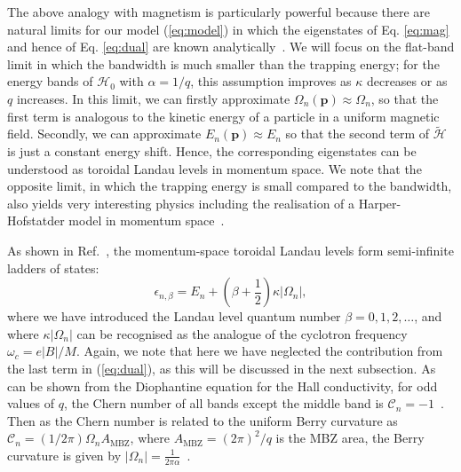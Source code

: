 \documentclass[twocolumn, 10pt, aps, superscriptaddress, floatfix, showpacs, pra, citeautoscript]{revtex4-1}
\newcommand{\vt}[1]{\mathbf{#1}}
\begin{document}
The above analogy with magnetism is particularly powerful because there are natural limits for our model (\ref{eq:model}) in which the eigenstates of Eq. \ref{eq:mag} and hence of Eq. \ref{eq:dual} are known analytically~\cite{price2014magnetic, ozawa2014momhh, Claassen_prl_2015}. We will focus on the flat-band limit in which the bandwidth is much smaller than the trapping energy; for the energy bands of $\mathcal{H}_0$ with $\alpha = 1/q$, this assumption improves as $\kappa$ decreases or as $q$ increases. In this limit, we can firstly approximate $\Omega_{n}(\mathbf{p}) \approx \Omega_n$, so that the first term is analogous to the kinetic energy of a particle in a uniform magnetic field. Secondly, we can approximate
$E_n(\vt{p}) \approx E_n$ so that the second term of $\widetilde{\mathcal{H}}$ is just a constant energy shift. Hence, the corresponding eigenstates can be understood as toroidal Landau levels in momentum space. We note that the opposite limit, in which the trapping energy is small compared to the bandwidth, also yields very interesting physics including the realisation of a Harper-Hofstatder model in momentum space~\cite{ozawa2014momhh, scaffidi2014exact}. 

As shown in Ref.~\cite{price2014magnetic}, the momentum-space toroidal Landau levels form semi-infinite ladders of states:
%
\begin{equation}\label{eq:ladders}
  \epsilon_{n,\beta} = E_n  + \left(\beta + \frac{1}{2}\right) \kappa |\Omega_n|  ,
\end{equation}
where we have introduced the Landau level quantum number
$\beta = 0,1,2,\dots$, and where $\kappa |\Omega_n|$ can be recognised as the analogue of the cyclotron frequency
$\omega_c = e |B| /M $. Again, we note that here we have neglected the contribution from the last term in (\ref{eq:dual}), as this will be discussed in the next subsection. As can be shown from the Diophantine equation for the Hall conductivity, for odd values of $q$, the Chern number of all bands except the middle band is $\mathcal{C}_n = -1$~\cite{bernevig2013topological}. Then as the Chern number is related to the uniform Berry curvature as $\mathcal{C}_n = (1/2\pi) \Omega_n A_{\text{MBZ}}$, where $A_{\text{MBZ}} = (2\pi)^2/q$ is the MBZ area, the Berry curvature is given by $|\Omega_n| = \frac{1}{2\pi\alpha}$~\cite{price2014magnetic}.  
\end{document}
